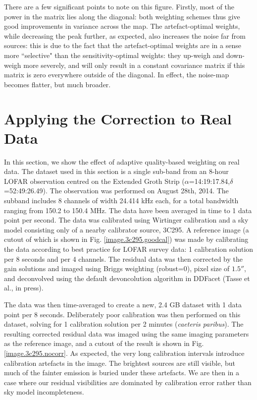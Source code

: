 \pg
There are a few significant points to note on this figure. Firstly, most of the power in the matrix lies along the diagonal: both weighting schemes thus give good improvements in variance across the map. The artefact-optimal weights, while decreasing the peak further, as expected, also increases the noise far from sources: this is due to the fact that the artefact-optimal weights are in a sense more ``selective" than the sensitivity-optimal weights: they up-weigh and down-weigh more severely, and will only result in a constant covariance matrix if this matrix is zero everywhere outside of the diagonal. {In effect, the noise-map becomes flatter, but much broader.}

\section{Applying the Correction to Real Data}





\pg
In this section, we show the effect of adaptive quality-based weighting on real data. The dataset used in this section is a single sub-band from an 8-hour LOFAR observation centred on the Extended Groth Strip ($\alpha$=14:19:17.84,$\delta$=52:49:26.49). The observation was performed on August 28th, 2014. The subband includes 8 channels of width 24.414 kHz each, for a total bandwidth ranging from 150.2 to 150.4 MHz. The data have been averaged in time to 1 data point per second. The data was calibrated using Wirtinger calibration \citep[see][and references therein]{2014arXiv1410.8706T,2015MNRAS.449.2668S} and a sky model consisting only of a nearby calibrator source, 3C295. A reference image (a cutout of which is shown in Fig. \ref{image.3c295.goodcal}) was made by calibrating the data according to best practice for LOFAR survey data: 1 calibration solution per 8 seconds and per 4 channels. {The residual data was then corrected by the gain solutions and imaged} using Briggs weighting (robust=0), pixel size of $1.5''$, and deconvolved using the default devoncolution algorithm in DDFacet (Tasse et al., in press).

\pg
The data was then time-averaged to create a new, 2.4 GB dataset with 1 data point per 8 seconds. Deliberately poor calibration was then performed on this dataset, solving for 1 calibration solution per 2 minutes ({\it caeteris paribus}). The resulting corrected residual data was imaged using the same imaging parameters as the reference image, and a cutout of the result is shown in Fig. \ref{image.3c295.nocorr}. As expected, the very long calibration intervals introduce calibration artefacts in the image. The brightest sources are still visible, but much of the fainter emission is buried under these artefacts. We are then in a case where our residual visibilities are dominated by calibration error rather than sky model incompleteness.

